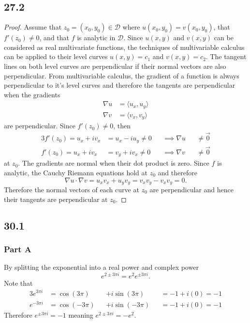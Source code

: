 \documentclass[12pt,titlepage]{extarticle}
\begin{document}
\subsection*{27.2}
\begin{proof}
    Assume that $z_0 = (x_0, y_0) \in \mathcal{D}$ where $u(x_0, y_0) = v(x_0, y_0)$, that $f'(z_0) \neq 0$, and that $f$ is analytic in $\mathcal{D}$. Since $u(x,y)$ and $v(x,y)$ can be considered as real multivariate functions, the techniques of multivariable calculus can be applied to their level curves $u(x,y) = c_1$ and $v(x,y) = c_2$. The tangent lines on both level curves are perpendicular if their normal vectors are also perpendicular. From multivariable calculus, the gradient of a function is always perpendicular to it's level curves and therefore the tangents are perpendicular when the gradients
    \begin{align*}
        \nabla u &= \langle u_x, u_y \rangle \\
        \nabla v &= \langle v_x, v_y \rangle
    \end{align*}
    are perpendicular. Since $f'(z_0) \neq 0$, then
    \begin{alignat*}{3}
        f'(z_0) = u_x + iv_x &= u_x - i u_y \neq 0 &&\implies \nabla u &&\neq \vec{0} \\
        f'(z_0) = u_x + iv_x &= v_y + i v_x \neq 0 &&\implies \nabla v &&\neq \vec{0}
    \end{alignat*}
    at $z_0$. The gradients are normal when their dot product is zero. Since $f$ is analytic, the Cauchy Riemann equations hold at $z_0$ and therefore
    \[
        \nabla u \cdot \nabla v = u_x v_x + u_y v_y = v_x v_y - v_x v_y = 0
    .\]
    Therefore the normal vectors of each curve at $z_0$ are perpendicular and hence their tangents are perpendicular at $z_0$.
\end{proof}

\subsection*{30.1}
\subsubsection*{Part A}
By splitting the exponential into a real power and complex power
\[
    e^{2 \pm 3 \pi i} = e^2 e^{\pm 3 \pi i}
.\]
Note that
\begin{alignat*}{3}
    e^{3 \pi i} &= \cos(3 \pi) &&+ i \sin(3 \pi) &&= -1 + i(0) = -1 \\
    e^{-3 \pi i} &= \cos(-3 \pi) &&+ i \sin(-3 \pi) &&= -1 + i(0) = -1
\end{alignat*}
Therefore $e^{\pm 3 \pi i} = -1$ meaning $e^{2 \pm 3 \pi i} = -e^2$.
\end{document}
